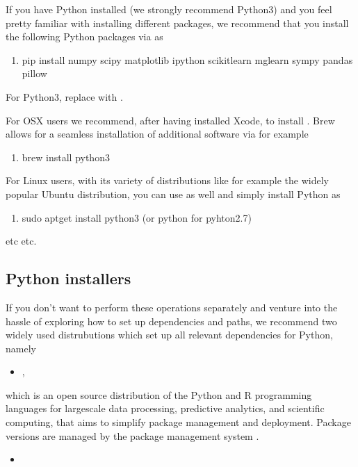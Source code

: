 \documentclass[letterpaper,10pt,english]{sphinxmanual}
\begin{document}
If you have Python installed (we strongly recommend Python3) and you feel
pretty familiar with installing different packages, we recommend that
you install the following Python packages via  as
\begin{enumerate}
%
\item {} 
pip install numpy scipy matplotlib ipython scikit\sphinxhyphen{}learn mglearn sympy pandas pillow

\end{enumerate}

For Python3, replace  with .

For OSX users we recommend, after having installed Xcode, to
install . Brew allows for a seamless installation of additional
software via for example
\begin{enumerate}
%
\item {} 
brew install python3

\end{enumerate}

For Linux users, with its variety of distributions like for example the widely popular Ubuntu distribution,
you can use  as well and simply install Python as
\begin{enumerate}
%
\item {} 
sudo apt\sphinxhyphen{}get install python3  (or python for pyhton2.7)

\end{enumerate}

etc etc.


\subsection{Python installers}
\label{\detokenize{chapter2:python-installers}}
If you don’t want to perform these operations separately and venture
into the hassle of exploring how to set up dependencies and paths, we
recommend two widely used distrubutions which set up all relevant
dependencies for Python, namely
\begin{itemize}
\item {} 
,

\end{itemize}

which is an open source
distribution of the Python and R programming languages for large\sphinxhyphen{}scale
data processing, predictive analytics, and scientific computing, that
aims to simplify package management and deployment. Package versions
are managed by the package management system .
\begin{itemize}
\item {} 

\end{itemize}
\end{document}
